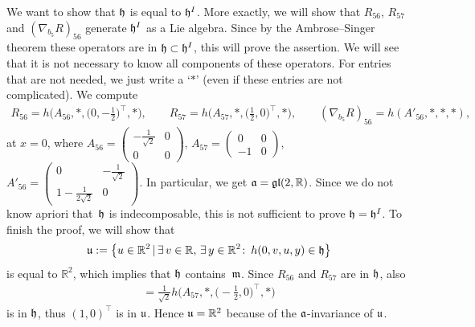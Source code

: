 \documentclass[11pt]{article}
\numberwithin{equation}{section}
\newcommand\fh{{\frak h}}
\newcommand\fm{{\frak m}}
\newcommand\fa{{\frak a}}
\newcommand\fu{{\frak u}}
\newcommand{\fgl}{\mathop{{\frak g \frak l}}}
\newcommand\RR{{\mathbb R}}
\begin{document}
We want to show that $\fh$ is equal to $\fh^I$. More exactly, we will show that $R_{56}$, $R_{57}$ and $(\nabla _{b_5}R)_{56}$ generate $\fh^I$ as a Lie algebra. Since by the Ambrose--Singer theorem these operators are in $\fh\subset \fh^I$, this will prove the assertion. We will see that it is not necessary to know all components of these operators. For entries that are not needed, we just write a `$*$' (even if these entries are not complicated). We compute
\begin{gather*}
R_{56}= h\big(A_{56},*,\big( 0,-\tfrac 12\big)^\top\!,* \big), \qquad\!\!
R_{57}= h\big(A_{57},*,\big( \tfrac12,0)^\top\!,* \big) , \qquad\!\!
(\nabla _{b_5}R)_{56}= h(A'_{56},*,*,* ),
\end{gather*}
at $x=0$, where $ A_{56}=\left( \begin{smallmatrix} -\frac1{\sqrt 2}&0\\0&0\end{smallmatrix}\right)$, $ A_{57}=\left( \begin{smallmatrix}0&0\\-1&0\end{smallmatrix}\right)$, $ A'_{56}=\left( \begin{smallmatrix}0& -\frac1{\sqrt 2}\\1-\frac1{2\sqrt 2}&0\end{smallmatrix}\right)$. In particular, we get $\fa=\fgl(2,\RR)$. Since we do not know apriori that~$\fh$ is indecomposable, this is not sufficient to prove $\fh=\fh^I$. To finish the proof, we will show that \begin{gather*}\fu:= \big\{u\in\RR^2 \,|\, \exists\, v\in\RR,\,\exists\, y\in\RR^2\colon\, h(0,v,u,y)\in \fh\big\}\end{gather*} is equal to $\RR^2$, which implies that $\fh$ contains~$\fm$. Since $R_{56}$ and $R_{57}$ are in $\fh$, also
\begin{gather*}[R_{56},R_{57}]= \tfrac 1{\sqrt{2} }h\big(A_{57},*,\big({-} \tfrac12,0\big)^\top,*\big) \end{gather*}
is in $\fh$, thus $(1,0)^\top$ is in $\fu$. Hence $\fu=\RR^2$ because of the $\fa$-invariance of $\fu$.
\end{document}
